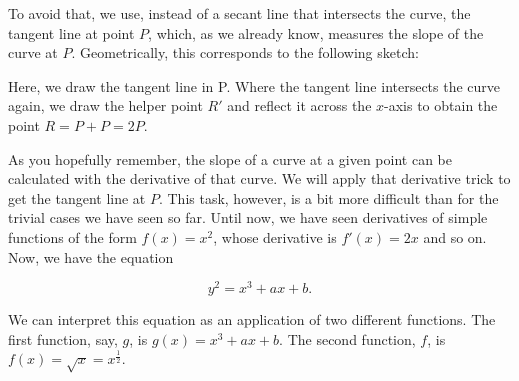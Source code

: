 \documentclass[tikz]{scrreprt}
\begin{document}
To avoid that, we use, instead of a secant line
that intersects the curve, the tangent line at
point $P$, which, as we already know, measures 
the slope of the curve at $P$.
Geometrically, this corresponds to the following sketch:

\begin{center}
\end{center}

Here, we draw the tangent line in P.
Where the tangent line intersects the curve again,
we draw the helper point $R'$ and reflect it across
the $x$-axis to obtain the point $R = P+P = 2P$.

As you hopefully remember, the slope of a curve 
at a given point can be calculated with the derivative of that curve.
We will apply that derivative trick to get the tangent line
at $P$. This task, however, is a bit more difficult than
for the trivial cases we have seen so far.
Until now, we have seen derivatives of simple functions
of the form $f(x) = x^2$, whose derivative is $f'(x) = 2x$
and so on. Now, we have the equation

\begin{equation}
y^2 = x^3 + ax + b.
\end{equation}

We can interpret this equation as an application of
two different functions. The first function, say, $g$,
is $g(x) = x^3 + ax + b$. The second function, $f$, is
$f(x) = \sqrt{x} = x^{\frac{1}{2}}$.
\end{document}
